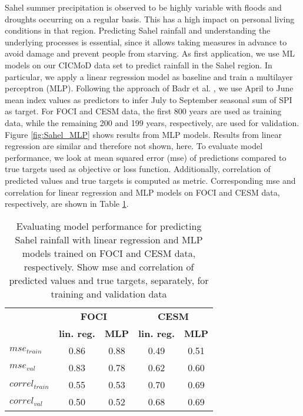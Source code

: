 \documentclass{CUP-JNL-DTM}%
\theoremstyle{definition}
\numberwithin{equation}{section}
\begin{document}
Sahel summer precipitation is observed to be highly variable with floods and droughts occurring on a regular basis. This has a high impact on personal living conditions in that region. Predicting Sahel rainfall and understanding the underlying processes is essential, since it allows taking measures in advance to avoid damage and prevent people from starving. As first application, we use ML models on our CICMoD data set to predict rainfall in the Sahel region. In particular, we apply a linear regression model as baseline and train a multilayer perceptron (MLP). Following the approach of Badr et al. \cite{Badr2014}, we use April to June mean index values as predictors to infer July to September seasonal sum of SPI as target. For FOCI and CESM data, the first 800 years are used as training data, while the remaining 200 and 199 years, respectively, are used for validation. Figure \ref{fig:Sahel_MLP} shows results from MLP models. Results from linear regression are similar and therefore not shown, here. To evaluate model performance, we look at mean squared error (mse) of predictions compared to true targets used as objective or loss function. Additionally, correlation of predicted values and true targets is computed as metric. Corresponding mse and correlation for linear regression and MLP models on FOCI and CESM data, respectively, are shown in Table \ref{tab:Sahel_Eval}.

\begin{table}
\caption{Evaluating model performance for predicting Sahel rainfall with linear regression and MLP models trained on FOCI and CESM data, respectively. Show mse and correlation of predicted values and true targets, separately, for training and validation data} \label{tab:Sahel_Eval}

\begin{center}
\begin{tabular}{|l|c|c|c|c|}
\hline
& \multicolumn{2}{c|}{\textbf{FOCI}} & \multicolumn{2}{c|}{\textbf{CESM}} \\
& \textbf{lin. reg.} & \textbf{MLP} & \textbf{lin. reg.} & \textbf{MLP} \\
\hline
$mse_{train}$ & 0.86 & 0.88 & 0.49 & 0.51 \\
$mse_{val}$ & 0.83 & 0.78 & 0.62 & 0.60 \\
\hline
$correl_{train}$ & 0.55 & 0.53 & 0.70 & 0.69 \\
$correl_{val}$ & 0.50 & 0.52 & 0.68 & 0.69 \\
\hline
\end{tabular}
\end{center}
\end{table}
\end{document}
